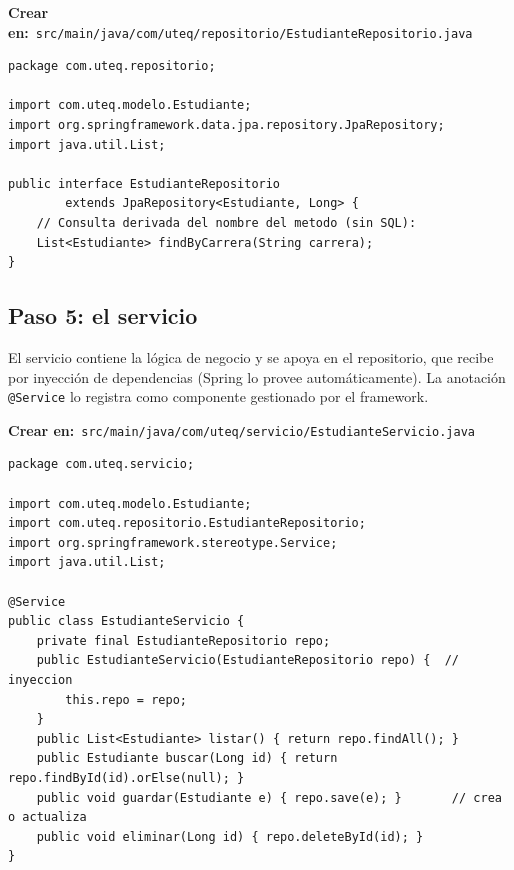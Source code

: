 \documentclass[11pt]{article}
\begin{document}
{\small\color{jwebazulo}\textbf{Crear en:}~}\texttt{src/\allowbreak{}main/\allowbreak{}java/\allowbreak{}com/\allowbreak{}uteq/\allowbreak{}repositorio/\allowbreak{}Estudiante\allowbreak{}Repositorio.\allowbreak{}java}\par\nobreak\vspace{-1pt}
\begin{cajacodigo}
\begin{lstlisting}[style=java]
package com.uteq.repositorio;

import com.uteq.modelo.Estudiante;
import org.springframework.data.jpa.repository.JpaRepository;
import java.util.List;

public interface EstudianteRepositorio
        extends JpaRepository<Estudiante, Long> {
    // Consulta derivada del nombre del metodo (sin SQL):
    List<Estudiante> findByCarrera(String carrera);
}
\end{lstlisting}
\end{cajacodigo}
\vspace{2pt}
\subsection{Paso 5: el servicio}
El servicio contiene la lógica de negocio y se apoya en el repositorio, que recibe por inyección de dependencias (Spring lo provee automáticamente). La anotación \texttt{@Service} lo registra como componente gestionado por el framework.

{\small\color{jwebazulo}\textbf{Crear en:}~}\texttt{src/\allowbreak{}main/\allowbreak{}java/\allowbreak{}com/\allowbreak{}uteq/\allowbreak{}servicio/\allowbreak{}Estudiante\allowbreak{}Servicio.\allowbreak{}java}\par\nobreak\vspace{-1pt}
\begin{cajacodigo}
\begin{lstlisting}[style=java]
package com.uteq.servicio;

import com.uteq.modelo.Estudiante;
import com.uteq.repositorio.EstudianteRepositorio;
import org.springframework.stereotype.Service;
import java.util.List;

@Service
public class EstudianteServicio {
    private final EstudianteRepositorio repo;
    public EstudianteServicio(EstudianteRepositorio repo) {  // inyeccion
        this.repo = repo;
    }
    public List<Estudiante> listar() { return repo.findAll(); }
    public Estudiante buscar(Long id) { return repo.findById(id).orElse(null); }
    public void guardar(Estudiante e) { repo.save(e); }       // crea o actualiza
    public void eliminar(Long id) { repo.deleteById(id); }
}
\end{lstlisting}
\end{cajacodigo}
\vspace{2pt}
\end{document}
